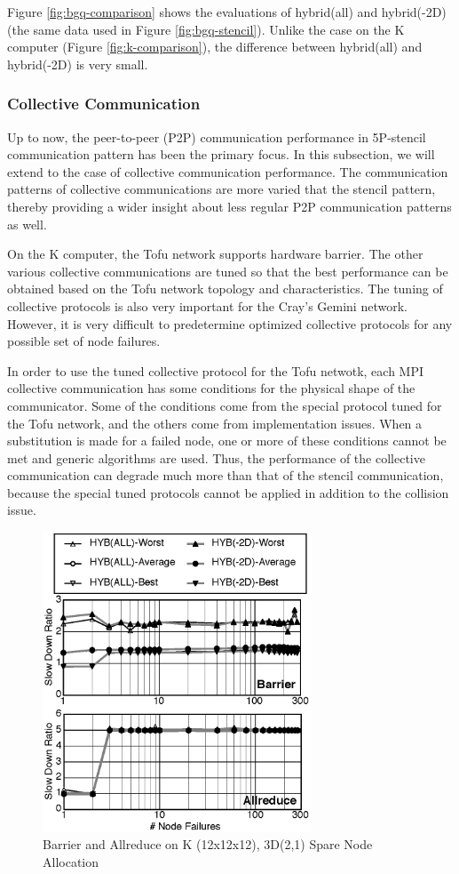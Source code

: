 \documentclass[Afour,times,sagev]{sagej}
\begin{document}
Figure \ref{fig:bgq-comparison} shows the evaluations of hybrid(all)
and hybrid(-2D) (the same data used in Figure
\ref{fig:bgq-stencil}). Unlike the case on the K computer (Figure
\ref{fig:k-comparison}), the difference between hybrid(all) and
hybrid(-2D) is very small.

\subsubsection{Collective Communication}

Up to now, the peer-to-peer (P2P) communication performance in
5P-stencil communication pattern has been the primary focus. In this
subsection, we will extend to the case of collective communication
performance.
The communication patterns of collective communications are more
varied that the stencil pattern, thereby providing a wider insight
about less regular P2P communication patterns as well.

On the K computer, the Tofu network supports hardware barrier. The
other various collective communications are tuned so that the best
performance can be obtained based on the Tofu network topology and 
characteristics\cite{sumimoto-k}. The tuning of collective protocols
is also very important for the Cray's Gemini
network\cite{Pena:2013:ATM:2488551.2488564}. However, it is very
difficult to predetermine optimized collective protocols for any
possible set of node failures. 

In order to use the tuned collective protocol for the Tofu netwotk,
each MPI collective communication has some conditions for the physical
shape of the communicator. Some of the conditions come from the
special protocol tuned for the Tofu network, and the others come from
implementation issues. When a substitution is made for a failed node,
one or more of these conditions cannot be met and generic algorithms
are used. Thus, the performance of the collective communication can
degrade much more than that of the stencil communication, because the
special tuned protocols cannot be applied in addition to the collision
issue. 

\begin{figure}[ht]
\centering
\includegraphics[width=80mm]{Figs/K-Collective.eps}
  \caption{Barrier and Allreduce on K (12x12x12), 3D(2,1) Spare Node
    Allocation}
  \label{fig:k-collective}
\end{figure}
\end{document}
